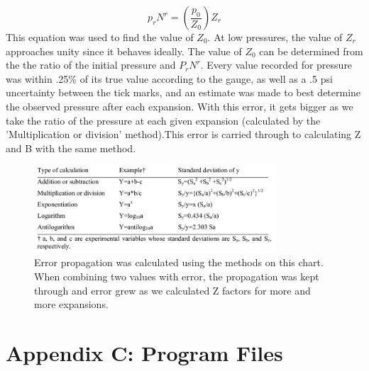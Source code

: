 \documentclass{article}
\begin{document}
\begin{equation} \label{eq:3} 
p_{r}N^{r} = \left(\frac{p_{0}}{Z_{0}}\right)Z_{r}
\end{equation}
This equation was used to find the value of $Z_0$. At low pressures, the value of $Z_r$ approaches unity since it behaves ideally. The value of $Z_0$ can be determined from the the ratio of the initial pressure and $P_rN^r$. \linebreak
\linebreak
Every value recorded for pressure was within .25\% of its true value according to the gauge, as well as a .5 psi uncertainty between the tick marks, and an estimate was made to best determine the observed pressure after each expansion. With this error, it gets bigger as we take the ratio of the pressure at each given expansion (calculated by the 'Multiplication or division' method).This error is carried through to calculating Z and B with the same method.

\begin{figure}[H] \centering
\includegraphics[width=0.8\textwidth]{images/error.png}
\caption{Error propagation was calculated using the methods on this chart. When combining two values with error, the propagation was kept through and error grew as we calculated Z factors for more and more expansions.
\label{fig1}}\end{figure}
    


\centering \section*{Appendix C: Program Files} 
\end{document}
